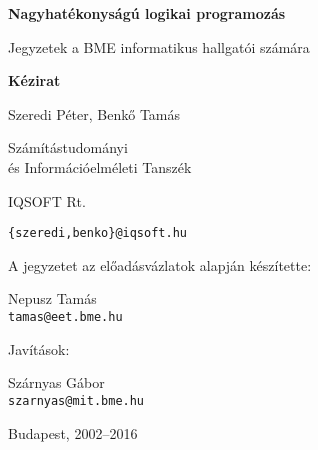 \vspace*{3cm}
\thispagestyle{empty}

\centerline{\Huge\bf Nagyhatékonyságú logikai programozás}

\vspace{0.5cm}

\centerline{\Large  Jegyzetek a BME informatikus hallgatói számára}
\vspace{1cm}

\centerline{\large\bf Kézirat}
\vfill


\begin{center}
{\Large Szeredi Péter, Benk{\H o} Tamás
	\vspace{0.3cm}
	
	Számítástudományi\\
	és Információelméleti Tanszék
	\vspace{0.3cm}
	
	IQSOFT Rt.}
\vspace{0.3cm}

{\large\tt \{szeredi,benko\}@iqsoft.hu}

\vspace{2cm}

{\large A jegyzetet az előadásvázlatok alapján készítette:\\
	
	\vspace{0.3cm}
	
	\Large Nepusz Tamás \\
	\vspace{0.3cm}
	{\large\tt tamas@eet.bme.hu}
}

\vspace{1cm}

{\large Javítások:\\

	\vspace{0.3cm}

	\Large Szárnyas Gábor \\
	\vspace{0.3cm}
	{\large\tt szarnyas@mit.bme.hu}
}
	
\end{center}

\vspace{3cm}

\centerline{\large Budapest, 2002--2016}

\clearpage
